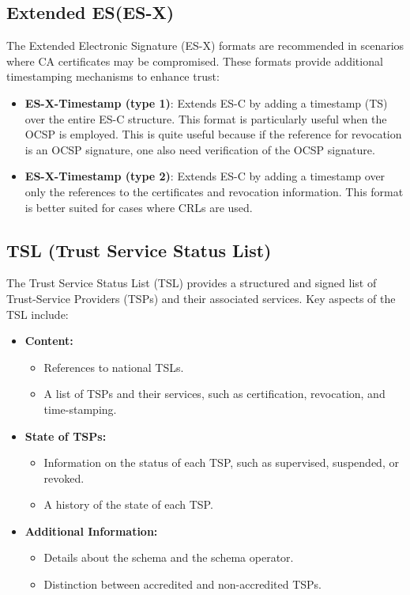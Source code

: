 \subsection{Extended ES(ES-X)}

The Extended Electronic Signature (ES-X) formats are recommended in
scenarios where CA certificates may be compromised. These formats
provide additional timestamping mechanisms to enhance trust:

\begin{itemize}
    \item \textbf{ES-X-Timestamp (type 1)}: 
    Extends ES-C by adding a timestamp (TS) over the entire ES-C
    structure. This format is particularly useful when the OCSP is
    employed. This is quite useful because if the reference for
    revocation is an OCSP signature, one also need verification of the 
    OCSP signature.

    \item \textbf{ES-X-Timestamp (type 2)}: 
    Extends ES-C by adding a timestamp over only the references to the
    certificates and revocation information. This format is better
    suited for cases where CRLs are used.
\end{itemize}

\subsection{TSL (Trust Service Status List)}

The Trust Service Status List (TSL) provides a structured and signed
list of Trust-Service Providers (TSPs) and their associated services.
Key aspects of the TSL include:

\begin{itemize}
    \item \textbf{Content:}
    \begin{itemize}
        \item References to national TSLs.
        \item A list of TSPs and their services, such as certification, revocation, and time-stamping.
    \end{itemize}

    \item \textbf{State of TSPs:}
    \begin{itemize}
        \item Information on the status of each TSP, such as supervised, suspended, or revoked.
        \item A history of the state of each TSP.
    \end{itemize}

    \item \textbf{Additional Information:}
    \begin{itemize}
        \item Details about the schema and the schema operator.
        \item Distinction between accredited and non-accredited TSPs.
    \end{itemize}
\end{itemize}

